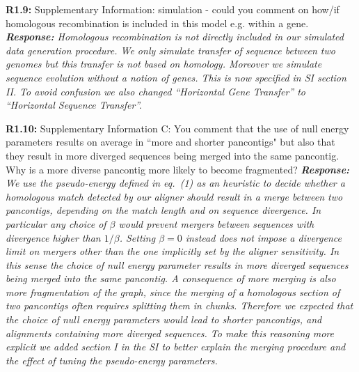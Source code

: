 \documentclass[aps,rmp,onecolumn]{revtex4-1}
\newcommand{\Marco}[1]{{\color{gray}Marco: #1}}
\newcommand{\Liam}[1]{{\color{teal}Liam: #1}}
\newcommand{\reviewer}[2]{\textbf{#1:} #2\vskip 5mm}
\newcommand{\response}[1]{{\it {\color{response}\textbf{Response:} #1}}\vskip 5mm}
\begin{document}
\reviewer{R1.9}{Supplementary Information: simulation - could you comment on how/if homologous recombination is included in this model e.g. within a gene.}
\response{Homologous recombination is not directly included in our simulated data generation procedure. We only simulate transfer of sequence between two genomes but this transfer is not based on homology. Moreover we simulate sequence evolution without a notion of genes. This is now specified in SI section II. To avoid confusion we also changed ``Horizontal Gene Transfer'' to ``Horizontal Sequence Transfer''.}

\reviewer{R1.10}{Supplementary Information C: You comment that the use of null energy parameters results on average in ``more and shorter pancontigs" but also that they result in more diverged sequences being merged into the same pancontig. Why is a more diverse pancontig more likely to become fragmented?}
\response{We use the pseudo-energy defined in eq.~(1) as an heuristic to decide whether a homologous match detected by our aligner should result in a merge between two pancontigs, depending on the match length and on sequence divergence. In particular any choice of $\beta$ would prevent mergers between sequences with divergence higher than $1/\beta$. Setting $\beta=0$ instead does not impose a divergence limit on mergers other than the one implicitly set by the aligner sensitivity. In this sense the choice of null energy parameter results in more diverged sequences being merged into the same pancontig. A consequence of more merging is also more fragmentation of the graph, since the merging of a homologous section of two pancontigs often requires splitting them in chunks. Therefore we expected that the choice of null energy parameters would lead to shorter pancontigs, and alignments containing more diverged sequences.
      To make this reasoning more explicit we added section I in the SI to better explain the merging procedure and the effect of tuning the pseudo-energy parameters.}
\end{document}
